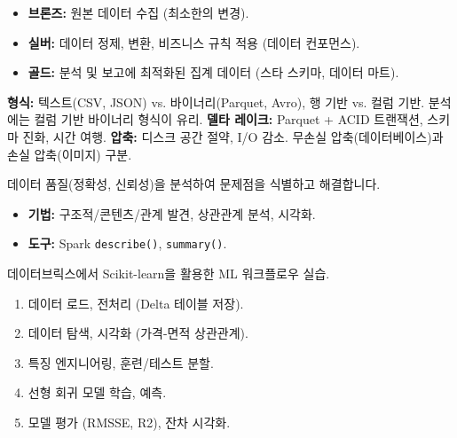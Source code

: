 \documentclass[11pt,a4paper]{article}
\theoremstyle{definition}
\newcommand{\code}[1]{\texttt{#1}}
\begin{document}
\begin{tcolorbox}[summary, title=데이터 아키텍처 레이어]
\begin{itemize}
    \item \textbf{브론즈:} 원본 데이터 수집 (최소한의 변경).
    \item \textbf{실버:} 데이터 정제, 변환, 비즈니스 규칙 적용 (데이터 컨포먼스).
    \item \textbf{골드:} 분석 및 보고에 최적화된 집계 데이터 (스타 스키마, 데이터 마트).
\end{itemize}
\end{tcolorbox}

\begin{tcolorbox}[summary, title=데이터 형식 및 압축]
\textbf{형식:} 텍스트(CSV, JSON) vs. 바이너리(Parquet, Avro), 행 기반 vs. 컬럼 기반. 분석에는 컬럼 기반 바이너리 형식이 유리.
\textbf{델타 레이크:} Parquet + ACID 트랜잭션, 스키마 진화, 시간 여행.
\textbf{압축:} 디스크 공간 절약, I/O 감소. 무손실 압축(데이터베이스)과 손실 압축(이미지) 구분.
\end{tcolorbox}

\begin{tcolorbox}[summary, title=데이터 프로파일링]
데이터 품질(정확성, 신뢰성)을 분석하여 문제점을 식별하고 해결합니다.
\begin{itemize}
    \item \textbf{기법:} 구조적/콘텐츠/관계 발견, 상관관계 분석, 시각화.
    \item \textbf{도구:} Spark \code{describe()}, \code{summary()}.
\end{itemize}
\end{tcolorbox}

\begin{tcolorbox}[summary, title=Lab 01: 주택 가격 예측]
데이터브릭스에서 Scikit-learn을 활용한 ML 워크플로우 실습.
\begin{enumerate}
    \item 데이터 로드, 전처리 (Delta 테이블 저장).
    \item 데이터 탐색, 시각화 (가격-면적 상관관계).
    \item 특징 엔지니어링, 훈련/테스트 분할.
    \item 선형 회귀 모델 학습, 예측.
    \item 모델 평가 (RMSSE, R2), 잔차 시각화.
\end{enumerate}
\end{tcolorbox}
\end{document}
